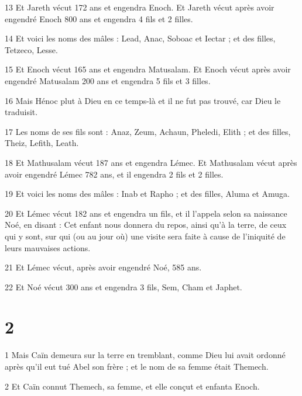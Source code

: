 \par 13 Et Jareth vécut 172 ans et engendra Enoch. Et Jareth vécut après avoir engendré Enoch 800 ans et engendra 4 fils et 2 filles.

\par 14 Et voici les noms des mâles : Lead, Anac, Soboac et Iectar ; et des filles, Tetzeco, Lesse.

\par 15 Et Enoch vécut 165 ans et engendra Matusalam. Et Enoch vécut après avoir engendré Matusalam 200 ans et engendra 5 fils et 3 filles.

\par 16 Mais Hénoc plut à Dieu en ce temps-là et il ne fut pas trouvé, car Dieu le traduisit.

\par 17 Les noms de ses fils sont : Anaz, Zeum, Achaun, Pheledi, Elith ; et des filles, Theiz, Lefith, Leath.

\par 18 Et Mathusalam vécut 187 ans et engendra Lémec. Et Mathusalam vécut après avoir engendré Lémec 782 ans, et il engendra 2 fils et 2 filles.

\par 19 Et voici les noms des mâles : Inab et Rapho ; et des filles, Aluma et Amuga.

\par 20 Et Lémec vécut 182 ans et engendra un fils, et il l'appela selon sa naissance Noé, en disant : Cet enfant nous donnera du repos, ainsi qu'à la terre, de ceux qui y sont, sur qui (ou au jour où) une visite sera faite à cause de l'iniquité de leurs mauvaises actions.

\par 21 Et Lémec vécut, après avoir engendré Noé, 585 ans.

\par 22 Et Noé vécut 300 ans et engendra 3 fils, Sem, Cham et Japhet.

\chapter{2}

\par 1 Mais Caïn demeura sur la terre en tremblant, comme Dieu lui avait ordonné après qu'il eut tué Abel son frère ; et le nom de sa femme était Themech.

\par 2 Et Caïn connut Themech, sa femme, et elle conçut et enfanta Enoch.

